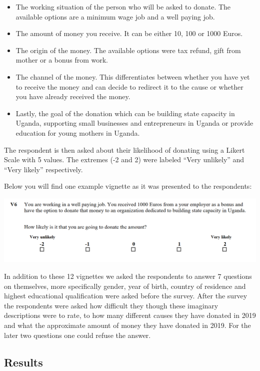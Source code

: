 \documentclass[
  12pt,
]{article}
\providecommand{\tightlist}{%
  \setlength{\itemsep}{0pt}\setlength{\parskip}{0pt}}
\begin{document}
\begin{itemize}
\tightlist
\item
  The working situation of the person who will be asked to donate. The
  available options are a minimum wage job and a well paying job.
\item
  The amount of money you receive. It can be either 10, 100 or 1000
  Euros.
\item
  The origin of the money. The available options were tax refund, gift
  from mother or a bonus from work.
\item
  The channel of the money. This differentiates between whether you have
  yet to receive the money and can decide to redirect it to the cause or
  whether you have already received the money.
\item
  Lastly, the goal of the donation which can be building state capacity
  in Uganda, supporting small businesses and entrepreneurs in Uganda or
  provide education for young mothers in Uganda.
\end{itemize}

The respondent is then asked about their likelihood of donating using a
Likert Scale with 5 values. The extremes (-2 and 2) were labeled ``Very
unlikely'' and ``Very likely'' respectively.

Below you will find one example vignette as it was presented to the
respondents:

\includegraphics[width=1.05\linewidth]{Screenshot_vignette}

In addition to these 12 vignettes we asked the respondents to answer 7
questions on themselves, more specifically gender, year of birth,
country of residence and highest educational qualification were asked
before the survey. After the survey the respondents were asked how
difficult they though these imaginary descriptions were to rate, to how
many different causes they have donated in 2019 and what the approximate
amount of money they have donated in 2019. For the later two questions
one could refuse the answer.

\hypertarget{results}{%
\subsection{Results}\label{results}}
\end{document}
